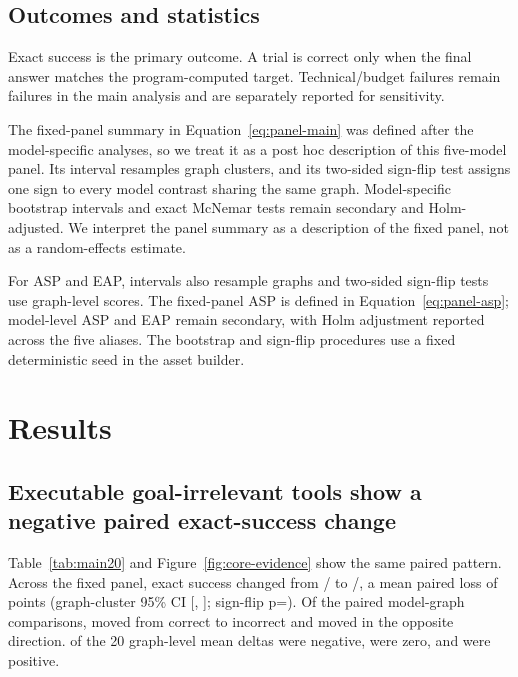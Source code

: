 \documentclass[pdflatex,sn-basic]{sn-jnl}
\begin{document}
\subsection{Outcomes and statistics}

Exact success is the primary outcome. A trial is correct only when the final
answer matches the program-computed target. Technical/budget failures remain failures
in the main analysis and are separately reported for sensitivity.

The fixed-panel summary in Equation~\ref{eq:panel-main} was defined after the
model-specific analyses, so we treat it as a post hoc description of this
five-model panel. Its interval resamples graph clusters, and its two-sided
sign-flip test assigns one sign to every model contrast sharing the same graph.
Model-specific bootstrap intervals and exact McNemar tests remain secondary and
Holm-adjusted. We interpret the panel summary as a description of the fixed
panel, not as a random-effects estimate.

For ASP and EAP, intervals also resample graphs and two-sided sign-flip tests
use graph-level scores. The fixed-panel ASP is defined in
Equation~\ref{eq:panel-asp}; model-level ASP and EAP remain secondary, with Holm
adjustment reported across the five aliases. The bootstrap and sign-flip
procedures use a fixed deterministic seed in the asset builder.

\section{Results}

\subsection{Executable goal-irrelevant tools show a negative paired exact-success change}



Table~\ref{tab:main20} and Figure~\ref{fig:core-evidence} show the same paired
pattern. Across the fixed panel, exact success changed from
\StudyMainBaseCorrect/\StudyMainPairs{} to
\StudyMainDistCorrect/\StudyMainPairs{}, a mean paired loss of
\StudyMainDeltaPP{} points (graph-cluster 95\% CI
[\StudyMainCILowPP, \StudyMainCIHighPP]; sign-flip p=\StudyMainSignFlipP).
Of the \StudyMainPairs{} paired model-graph comparisons,
\StudyBaselineOnly{} moved from correct to incorrect and
\StudyDistractorOnly{} moved in the opposite direction.
\StudyMainNegativeGraphs{} of the 20 graph-level mean deltas were negative,
\StudyMainZeroGraphs{} were zero, and \StudyMainPositiveGraphs{} were positive.
\end{document}
